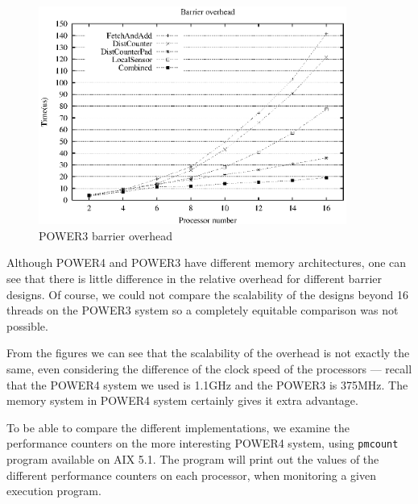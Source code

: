 \begin{figure}[!htbp]
  \begin{center}
    \includegraphics[angle=0, width=0.9\textwidth]{power3performance.eps}
    \caption{POWER3 barrier overhead}
    \label{fig:power3performance}
  \end{center}
\end{figure}

Although POWER4 and POWER3 have different memory
architectures\cite{Ste98}, one can see that there is little difference
in the relative overhead for different barrier designs. Of course, we
could not compare the scalability of the designs beyond 16 threads on
the POWER3 system so a completely equitable comparison was not
possible.

From the figures we can see that the scalability of the overhead
is not exactly the same, even considering the difference of the clock
speed of the processors --- recall that the POWER4 system we used is
1.1GHz and the POWER3 is 375MHz. The memory system in POWER4 system
certainly gives it extra advantage.

To be able to compare the different implementations, we examine the
performance counters on the more interesting POWER4 system, using
\texttt{pmcount} program available on AIX 5.1. The program will print
out the values of the different performance counters on each
processor, when monitoring a given execution program.

